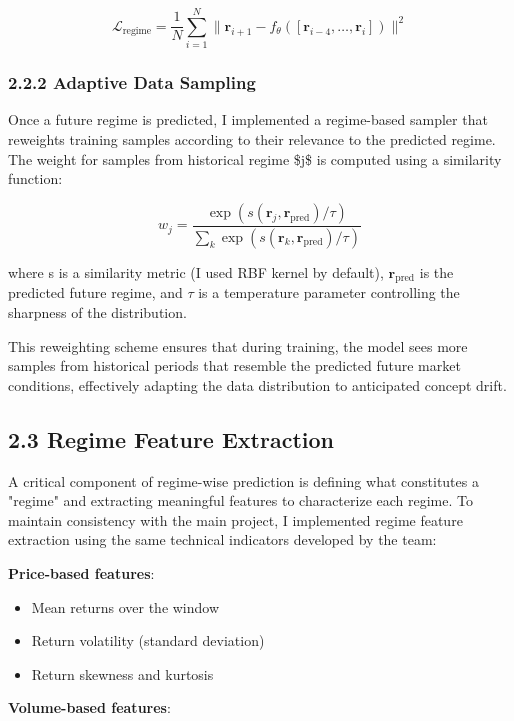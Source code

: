 \documentclass[
]{article}
\begin{document}
\[\mathcal{L}_{\text{regime}} = \frac{1}{N} \sum_{i=1}^{N} \|\mathbf{r}_{i+1} - f_{\theta}([\mathbf{r}_{i-4}, \ldots, \mathbf{r}_i])\|^2\]

\subsubsection{2.2.2 Adaptive Data
Sampling}\label{222-adaptive-data-sampling}

Once a future regime is predicted, I implemented a regime-based sampler
that reweights training samples according to their relevance to the
predicted regime. The weight for samples from historical regime \$j\$ is
computed using a similarity function:

\[w_j = \frac{\exp(s(\mathbf{r}_j, \mathbf{r}_{\text{pred}}) / \tau)}{\sum_{k} \exp(s(\mathbf{r}_k, \mathbf{r}_{\text{pred}}) / \tau)}\]

where s is a similarity metric (I used RBF kernel by default), \(\mathbf{r}_{\text{pred}}\) is the predicted future regime, and \(\tau\) is a temperature parameter controlling the sharpness of the distribution.

This reweighting scheme ensures that during training, the model sees
more samples from historical periods that resemble the predicted future
market conditions, effectively adapting the data distribution to
anticipated concept drift.

\subsection{2.3 Regime Feature
Extraction}\label{23-regime-feature-extraction}

A critical component of regime-wise prediction is defining what
constitutes a "regime" and extracting meaningful features to
characterize each regime. To maintain consistency with the main project,
I implemented regime feature extraction using the same technical
indicators developed by the team:

\textbf{Price-based features}:

\begin{itemize}
\item
  Mean returns over the window
\item
  Return volatility (standard deviation)
\item
  Return skewness and kurtosis
\end{itemize}

\textbf{Volume-based features}:
\end{document}

